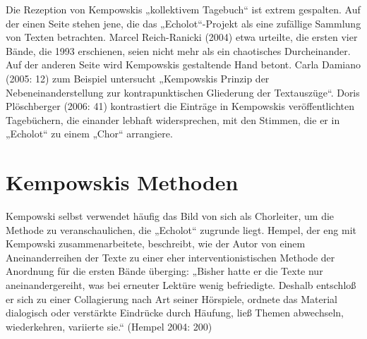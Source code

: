 \begin{multicols*}{2}
Die Rezeption von Kempowskis „kollektivem Tagebuch“ ist extrem gespalten. Auf der einen Seite stehen jene, die das „Echolot“-Projekt als eine zufällige Sammlung von Texten betrachten. Marcel Reich-Ranicki (2004) etwa urteilte, die ersten vier Bände, die 1993 erschienen, seien nicht mehr als ein chaotisches Durcheinander. Auf der anderen Seite wird Kempowskis gestaltende Hand betont. Carla Damiano (2005: 12) zum Beispiel untersucht „Kempowskis Prinzip der Nebeneinanderstellung zur kontrapunktischen Gliederung der Textauszüge“. Doris Plöschberger (2006: 41) kontrastiert die Einträge in Kempowskis veröffentlichten Tagebüchern, die einander lebhaft widersprechen, mit den Stimmen, die er in „Echolot“ zu einem „Chor“ arrangiere.

\section{Kempowskis Methoden}

\noindent Kempowski selbst verwendet häufig das Bild von sich als Chorleiter, um die Methode zu veranschaulichen, die „Echolot“ zugrunde liegt. Hempel, der eng mit Kempowski zusammenarbeitete, beschreibt, wie der Autor von einem Aneinanderreihen der Texte zu einer eher interventionistischen Methode der Anordnung für die ersten Bände überging: „Bisher hatte er die Texte nur aneinandergereiht, was bei erneuter Lektüre wenig befriedigte. Deshalb entschloß er sich zu einer Collagierung nach Art seiner Hörspiele, ordnete das Material dialogisch oder verstärkte Eindrücke durch Häufung, ließ Themen abwechseln, wiederkehren, variierte sie.“ (Hempel 2004: 200)


\end{multicols*}
